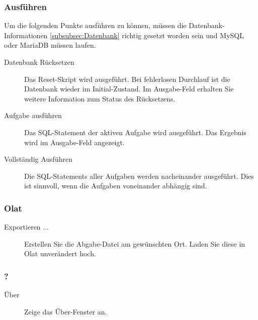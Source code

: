 \documentclass[11pt]{article}
\begin{document}
\subsubsection{Ausführen}
\label{subsubsec:run}
Um die folgenden Punkte ausführen zu können, müssen die Datenbank-\linebreak Informationen \ref{subsubsec:Datenbank} richtig gesetzt worden sein und MySQL oder MariaDB müssen laufen.
\begin{description}
	\item[\label{item:reset} Datenbank Rücksetzen] Das Reset-Skript wird ausgeführt. Bei fehlerlosen Durchlauf ist die Datenbank wieder im Initial-Zustand. Im Ausgabe-Feld erhalten Sie weitere Information zum Status des Rücksetzens. 
	\item[\label{item:runTask} Aufgabe ausführen] Das SQL-Statement der aktiven Aufgabe wird ausgeführt. Das Ergebnis wird im Ausgabe-Feld angezeigt.
	\item[\label{item:runComplete} Vollständig Ausführen] Die SQL-Statements aller Aufgaben werden nacheinander ausgeführt. Dies ist sinnvoll, wenn die Aufgaben voneinander abhängig sind.
\end{description}

\subsubsection{Olat}
\label{subsubsec:Olat}
\begin{description}
	\item[\label{item:export} Exportieren ...] Erstellen Sie die Abgabe-Datei am gewünschten Ort. Laden Sie diese in Olat unverändert hoch.
\end{description}

\subsubsection{?}
\label{subsubsec:?}
\begin{description}
	\item[\label{item:about} Über] Zeige das Über-Fenster an.
\end{description}
\end{document}
